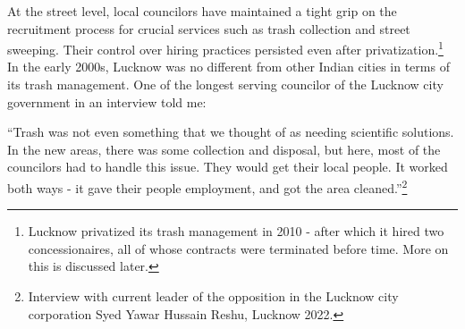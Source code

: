 At the street level, local councilors have maintained a tight grip on the recruitment process for crucial services such as trash collection and street sweeping. Their control over hiring practices persisted even after privatization.\footnote{Lucknow privatized its trash management in 2010 - after which it hired two concessionaires, all of whose contracts were terminated before time. More on this is discussed later.} In the early 2000s, Lucknow was no different from other Indian cities in terms of its trash management. One of the longest serving councilor of the Lucknow city government in an interview told me:

``Trash was not even something that we thought of as needing scientific solutions. In the new areas, there was some collection and disposal, but here, most of the councilors had to handle this issue. They would get their local people. It worked both ways - it gave their people employment, and got the area cleaned.''\footnote{Interview with current leader of the opposition in the Lucknow city corporation Syed Yawar Hussain Reshu, Lucknow 2022.}

